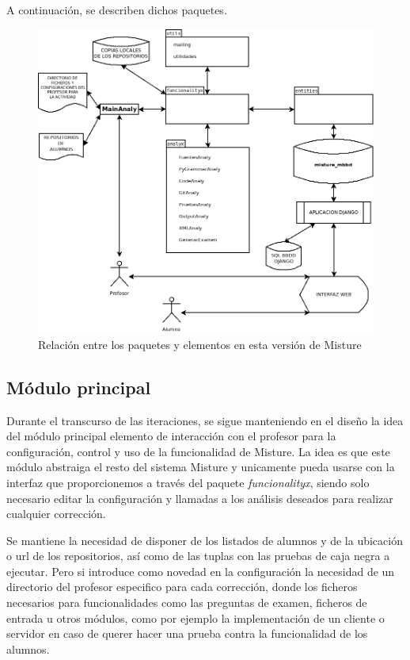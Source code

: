 A continuación, se describen dichos paquetes.

\begin{figure}[H]
   \centering
   \includegraphics[width=16cm]{img/Diagram3_iteracion2}
   \caption{Relación entre los paquetes y elementos en esta versión de Misture}
   \label{figura:regex}
\end{figure}



\subsection{Módulo principal} 
\label{subsec:mod_principal}

Durante el transcurso de las iteraciones, se sigue manteniendo en el diseño la idea del módulo principal elemento de interacción con el profesor para la configuración, control y uso de la funcionalidad de Misture. La idea es que este módulo abstraiga el resto del sistema Misture y unicamente pueda usarse con la interfaz que proporcionemos a través del paquete \textit{funcionalityx}, siendo solo necesario editar la configuración y llamadas a los análisis deseados para realizar cualquier corrección.


Se mantiene la necesidad de disponer de los listados de alumnos y de la ubicación o url de los repositorios, así como de las tuplas con las pruebas de caja negra a ejecutar. Pero si introduce como novedad en la configuración la necesidad de un directorio del profesor especifico para cada corrección, donde los ficheros necesarios para funcionalidades como las preguntas de examen, ficheros de entrada u otros módulos, como por ejemplo la implementación de un cliente o servidor en caso de querer hacer una prueba contra la funcionalidad de los alumnos.

